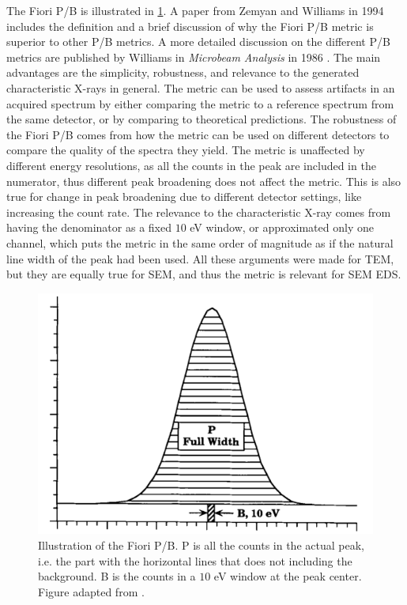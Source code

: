 

The Fiori P/B is illustrated in \cref{fig:fiori_pb}.
A paper from Zemyan and Williams in 1994 \cite{zemyan_standard_performance_1994} includes the definition and a brief discussion of why the Fiori P/B metric is superior to other P/B metrics.
A more detailed discussion on the different P/B metrics are published by Williams in \emph{Microbeam Analysis} in 1986 \cite{williams_standard_definitions_1986}.
The main advantages are the simplicity, robustness, and relevance to the generated characteristic X-rays in general.
The metric can be used to assess artifacts in an acquired spectrum by either comparing the metric to a reference spectrum from the same detector, or by comparing to theoretical predictions.
The robustness of the Fiori P/B comes from how the metric can be used on different detectors to compare the quality of the spectra they yield.
The metric is unaffected by different energy resolutions, as all the counts in the peak are included in the numerator, thus different peak broadening does not affect the metric.
This is also true for change in peak broadening due to different detector settings, like increasing the count rate.
The relevance to the characteristic X-ray comes from having the denominator as a fixed $10$ eV window, or approximated only one channel, which puts the metric in the same order of magnitude as if the natural line width of the peak had been used.
All these arguments were made for TEM, but they are equally true for SEM, and thus the metric is relevant for SEM EDS.




\begin{figure}[htbp]
    \centering
    \includegraphics[width=0.6\linewidth]{figures/FioriPB_TODO_remake.png}
    \caption{
        Illustration of the Fiori P/B.
        P is all the counts in the actual peak, i.e. the part with the horizontal lines that does not including the background.
        B is the counts in a $10$ eV window at the peak center.
        Figure adapted from \cite{zemyan_standard_performance_1994}.
        }
    \label{fig:fiori_pb}
\end{figure}

